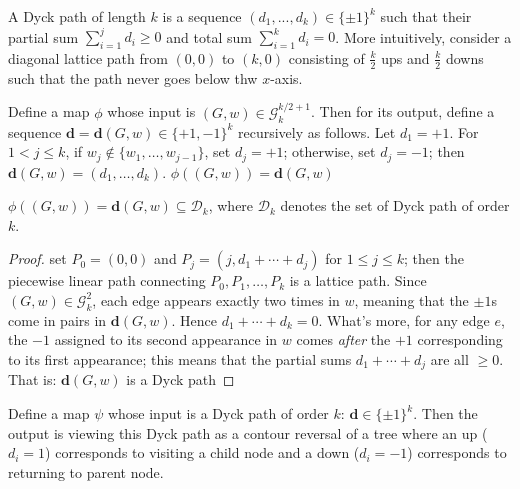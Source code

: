 \begin{definition}
    \notready
    \label{def:Dyck_paths}
  A Dyck path of length $k$ is a sequence $(d_1,...,d_k) \in \{\pm 1\}^k$ such that their partial sum $\sum_{i=1}^j d_i \geq 0$
  and total sum $\sum_{i = 1}^{k}d_i = 0$. More intuitively, consider a diagonal lattice path from $(0,0)$ to $(k, 0)$ consisting of
  $\frac{k}{2}$ ups and $\frac{k}{2}$ downs such that the path never goes below thw $x$-axis.
\end{definition}


\begin{definition}
    \notready
    \label{def:graph_to_Dyck_map}
   Define a map $\phi$ whose input is $(G, w) \in \mathcal{G}^{k/2 + 1}_k$. Then for its output,
   define a sequence $\mathbf{d}=\mathbf{d}(G,w)\in\{+1,-1\}^k$ recursively as follows.
   Let $d_1=+1$.  For $1<j\le k$, if $w_j\notin\{w_1,\ldots,w_{j-1}\}$, set $d_j=+1$; otherwise, set $d_j=-1$; then
   $\mathbf{d}(G,w) = (d_1,\ldots,d_k)$. $\phi((G,w)) = \mathbf{d}(G,w)$
\end{definition}


\begin{lemma}
    \notready
    \label{lem:graph_Dyck_correspondence}
  $\phi((G,w)) = \mathbf{d}(G,w) \subseteq \mathcal{D}_k$, where $\mathcal{D}_k$ denotes the set of Dyck path of order $k$.
  \begin{proof}
    \notready
    set $P_0 = (0,0)$ and $P_j = (j,d_1+\cdots+d_j)$ for $1\le j\le k$; then the piecewise linear path
    connecting $P_0,P_1,\ldots,P_k$ is a lattice path.  Since $(G,w)\in\mathcal{G}_k^2$, each edge appears exactly two times in $w$,
    meaning that the $\pm1$s come in pairs in $\mathbf{d}(G,w)$.  Hence $d_1+\cdots+d_k=0$.  What's more, for any edge $e$,
    the $-1$ assigned to its second appearance in $w$ comes {\em after} the $+1$ corresponding to its first appearance;
    this means that the partial sums $d_1+\cdots+d_j$ are all $\ge 0$.  That is: $\mathbf{d}(G,w)$ is a Dyck path
  \end{proof}
\end{lemma}


\begin{definition}
    \notready
    \label{def:Dyck_to_graph_map}
   Define a map $\psi$ whose input is a Dyck path of order $k$: $\mathbf{d} \in \{\pm1\}^k$. Then the output is viewing
  this Dyck path as a contour reversal of a tree where an up ($d_i = 1$) corresponds to visiting a child node
  and a down ($d_i = -1$) corresponds to returning to parent node.
\end{definition}


